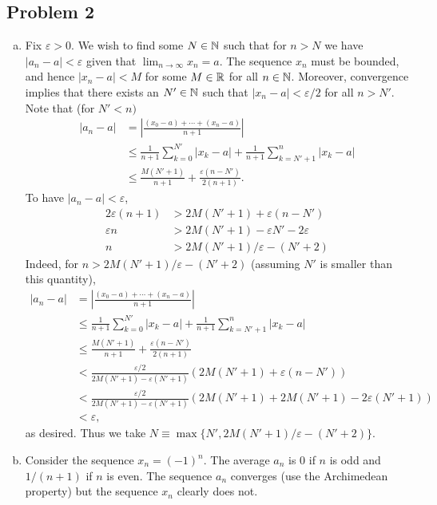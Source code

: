 \documentclass{../mathnotes}
\begin{document}
\subsection*{Problem 2}
\begin{enumerate}[(a)]
    \item Fix $\varepsilon>0$. We wish to find some $N\in\mathbb{N}$ such that for $n>N$ we have $|a_n-a|<\varepsilon$ given
        that $\lim_{n\to\infty} x_n=a$. The sequence $x_n$ must be bounded, and hence $|x_n-a|<M$ for some $M\in\mathbb{R}$ for
        all $n\in\mathbb{N}$. Moreover, convergence implies that there exists an $N'\in\mathbb{N}$ such that $|x_n-a|<\varepsilon/2$
        for all $n>N'$. Note that (for $N'<n)$
        \begin{align*}
            |a_n-a| &= \left\lvert \frac{(x_0-a)+\cdots+(x_n-a)}{n+1} \right\rvert\\
            &\leq \frac{1}{n+1}\sum_{k=0}^{N'}|x_k-a|+\frac{1}{n+1}\sum_{k=N'+1}^n|x_k-a|\\
            &\leq \frac{M(N'+1)}{n+1}+\frac{\varepsilon(n-N')}{2(n+1)}.
        \end{align*}
        To have $|a_n-a|<\varepsilon$,
        \begin{align*}
            2\varepsilon(n+1) &> 2M(N'+1)+\varepsilon(n-N')\\
            \varepsilon n&>2M(N'+1)-\varepsilon N'-2\varepsilon\\
            n &> 2M(N'+1)/\varepsilon -(N'+2)
        \end{align*}
        Indeed, for $n>2M(N'+1)/\varepsilon-(N'+2)$ (assuming $N'$ is smaller than this quantity),
        \begin{align*}
            |a_n-a| &= \left\lvert \frac{(x_0-a)+\cdots+(x_n-a)}{n+1} \right\rvert\\
            &\leq \frac{1}{n+1}\sum_{k=0}^{N'}|x_k-a|+\frac{1}{n+1}\sum_{k=N'+1}^n|x_k-a|\\
            &\leq \frac{M(N'+1)}{n+1}+\frac{\varepsilon(n-N')}{2(n+1)}\\
            &< \frac{\varepsilon/2}{2M(N'+1)-\varepsilon(N'+1)}\left(2M(N'+1)+\varepsilon(n-N') \right)\\
            &<\frac{\varepsilon/2}{2M(N'+1)-\varepsilon(N'+1)}\left(2M(N'+1)+2M(N'+1)-2\varepsilon(N'+1) \right)\\
            &< \varepsilon,
        \end{align*}
        as desired. Thus we take $N\equiv\max\{N',2M(N'+1)/\varepsilon-(N'+2)\}$.
    \item Consider the sequence $x_n=(-1)^n$. The average $a_n$ is 0 if $n$ is odd and $1/(n+1)$ if $n$ is even.
        The sequence $a_n$ converges (use the Archimedean property) but the sequence $x_n$ clearly does not.
\end{enumerate}
\end{document}
